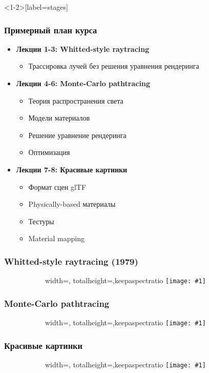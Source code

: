 \documentclass[10pt,handout]{beamer}
\newcommand{\slideimage}[1]{
  \begin{figure}
    \begin{adjustbox}{width=\textwidth, totalheight=\textheight-2\baselineskip-2\baselineskip,keepaspectratio}
      \texttt{[image: \#1]}
    \end{adjustbox}
  \end{figure}
}
\begin{document}
\begin{frame}<1-2>[label=stages]
\frametitle{Примерный план курса}
\pause
\begin{itemize}
\item \textbf{Лекции 1-3: Whitted-style raytracing}
\begin{itemize}
\item Трассировка лучей без решения уравнения рендеринга
\end{itemize}
\pause
\item \textbf{Лекции 4-6: Monte-Carlo pathtracing}
\begin{itemize}
\item Теория распространения света
\item Модели материалов
\item Решение уравнение рендеринга
\item Оптимизация
\end{itemize}
\pause
\item \textbf{Лекции 7-8: Красивые картинки}
\begin{itemize}
\item Формат сцен glTF
\item Physically-based материалы
\item Тестуры
\item Material mapping
\end{itemize}
\end{itemize}
\end{frame}

\begin{frame}
\frametitle{Whitted-style raytracing (1979)}
\begin{figure}
\slideimage{stage1.jpg}
\end{figure}
\end{frame}


\begin{frame}
\frametitle{Monte-Carlo pathtracing}
\begin{figure}
\slideimage{stage2.jpg}
\end{figure}
\end{frame}


\begin{frame}
\frametitle{Красивые картинки}
\begin{figure}
\slideimage{stage3.jpg}
\end{figure}
\end{frame}
\end{document}

